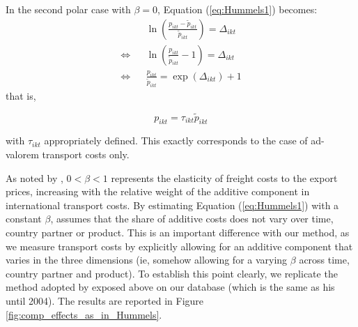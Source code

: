 \documentclass[a4paper,11pt]{article}
\begin{document}
In the second polar case with $\beta = 0$, Equation (\ref{eq:Hummels1}) becomes:
\begin{eqnarray*}
&&\ln \left(\frac{p_{ikt}- \widetilde{p}_{ikt}}{\widetilde{p}_{ikt}} \right) = \Delta_{ikt} \\
\Leftrightarrow && \ln \left(\frac{p_{ikt}}{\widetilde{p}_{ikt}}-1\right) = \Delta_{ikt}\\
\Leftrightarrow && \frac{p_{ikt}}{\widetilde{p}_{ikt}}  = \exp (\Delta_{ikt})+1
\end{eqnarray*}
\noindent that is,

$$p_{ikt} = \tau_{ikt} \widetilde{p}_{ikt}$$

\noindent with $\tau_{ikt}$ appropriately defined.
This exactly corresponds to the case of ad-valorem transport costs only.


As noted by \cite{hummels_skiba}, $0<\beta<1$ represents the elasticity of freight costs to the export prices, increasing with the relative weight of the additive component in international transport costs.
By estimating Equation (\ref{eq:Hummels1}) with a constant $\beta$, \cite{hummels2007} assumes that the share of additive costs does not vary over time, country partner or product.
This is an important difference with our method, as we measure transport costs by explicitly allowing for an additive component that varies in the three dimensions (ie, somehow allowing for a varying $\beta$ across time, country partner and product).
To establish this point clearly, we replicate the method adopted by \cite{hummels2007} exposed above on our database (which is the same as his until 2004).
The results are reported in Figure \ref{fig:comp_effects_as_in_Hummels}.
\end{document}
